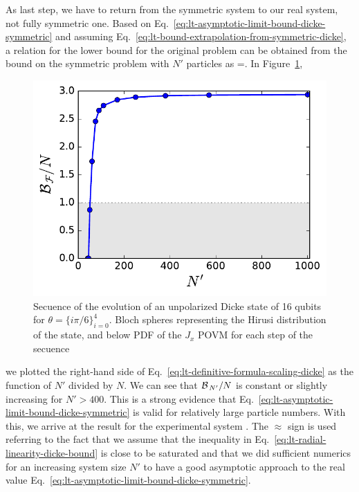 As last step, we have to return from the symmetric system to our real system, not fully symmetric one.
Based on Eq.~\eqref{eq:lt-asymptotic-limit-bound-dicke-symmetric} and assuming Eq.~\eqref{eq:lt-bound-extrapolation-from-symmetric-dicke}, a relation for the lower bound for the original problem can be obtained from the bound on the symmetric problem with $N'$ particles as
\be
  \label{eq:lt-definitive-formula-scaling-dicke}
  \approx {}  =.
\ee
In Figure~\ref{fig:assimpthotic-approach-to-the-bound-from-scaled-dicke},
\begin{figure}[htp]
  \centering
  \includegraphics[scale=.65]{img/LT_dicke_7900_asymp.pdf}
  \caption[Asymptotic behaviour of the bound for increasing size systems for Dicke like experimental data]{Secuence of the evolution of an unpolarized Dicke state of 16 qubits for $\theta=\{i\pi/6\}_{i=0}^4$. Bloch spheres representing the Hirusi distribution of the state, and below PDF of the $J_x$ POVM for each step of the secuence}
  \label{fig:assimpthotic-approach-to-the-bound-from-scaled-dicke}
\end{figure}
we plotted the right-hand side of Eq.~\eqref{eq:lt-definitive-formula-scaling-dicke} as the function of $N'$ divided by $N$.
We can see that $\mathcal{B}_{\, N' }/N$ is constant or slightly increasing for $N'>400$.
This is a strong evidence that Eq.~\eqref{eq:lt-asymptotic-limit-bound-dicke-symmetric} is valid for relatively large particle numbers.
With this, we arrive at the result for the experimental system
\be
  \label{eq:lt-result-experimental-dicke}
  .
\ee
The $\approx$ sign is used referring to the fact that we assume that the inequality in Eq.~\eqref{eq:lt-radial-linearity-dicke-bound} is close to be saturated and that we did sufficient numerics for an increasing system size $N'$ to have a good asymptotic approach to the real value Eq.~\eqref{eq:lt-asymptotic-limit-bound-dicke-symmetric}.

